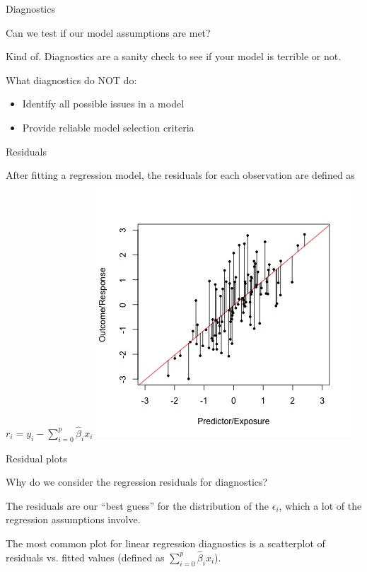 \documentclass[12pt,ignorenonframetext,]{beamer}
\providecommand{\tightlist}{%
\setlength{\itemsep}{0pt}\setlength{\parskip}{0pt}}
\begin{document}
\begin{frame}{Diagnostics}

Can we test if our model assumptions are met?

\pause

Kind of. Diagnostics are a sanity check to see if your model is
\alert{terrible} or not.

\pause

What diagnostics do NOT do:

\begin{itemize}
\tightlist
\item
  Identify all possible issues in a model
\item
  Provide reliable \alert{model selection} criteria
\end{itemize}

\end{frame}

\begin{frame}{Residuals}

After fitting a regression model, the \alert{residuals} for each
observation are defined as
\(r_i = y_i - \sum_{i=0}^p \hat{\beta}_i x_i\) \centering
\includegraphics{linear-regr-ls.jpg}

\end{frame}

\begin{frame}{Residual plots}

Why do we consider the regression residuals for diagnostics?

\pause

The residuals are our ``best guess'' for the distribution of the
\(\epsilon_i\), which a lot of the regression assumptions involve.

\pause

The most common plot for linear regression diagnostics is a scatterplot
of residuals vs. \alert{fitted values} (defined as
\(\sum_{i=0}^p \hat{\beta}_i x_i\)).

\end{frame}
\end{document}
